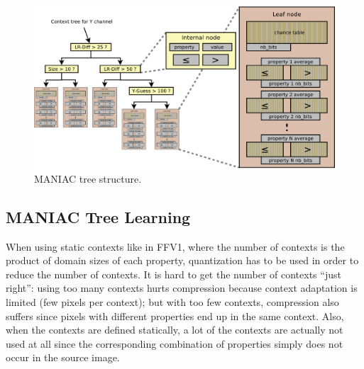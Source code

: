 \documentclass{article}
\begin{document}

\begin{figure}
\includegraphics[width=\linewidth]{images/context_tree}
\caption{MANIAC tree structure.}
\label{fig:context_tree}
\end{figure}

\subsection{MANIAC Tree Learning}
\label{sec:context_tree}

When using static contexts like in FFV1, where the number of contexts is the product of
domain sizes of each property, quantization has to be used in order to reduce
the number of contexts. It is hard to get the number of contexts ``just right'':
using too many contexts %
hurts compression because context adaptation is limited
(few pixels per context);
but with too few contexts, compression also suffers
since pixels with different properties end up in the same context.
Also, when the contexts are defined statically,
a lot of the contexts are actually not used at all since the corresponding
combination of properties simply does not occur in the source image.
\end{document}
